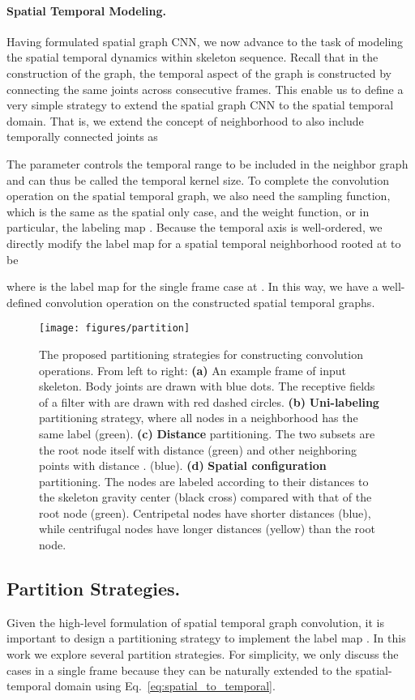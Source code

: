 \documentclass[letterpaper]{article} \usepackage{aaai18}  \usepackage{times}  \usepackage{helvet}  \usepackage{courier}  \usepackage{url}  \usepackage{graphicx}
\begin{document}
\paragraph{Spatial Temporal Modeling.}
Having formulated spatial graph CNN, we now advance to the task of modeling the spatial temporal dynamics within skeleton sequence.
Recall that in the construction of the graph, the temporal aspect of the graph is constructed by connecting the same joints across consecutive frames.
This enable us to define a very simple strategy to extend the spatial graph CNN to the spatial temporal domain. 
That is, we extend the concept of neighborhood to also include temporally connected joints as

The parameter  controls the temporal range to be included in the neighbor graph and can thus be called the temporal kernel size.
To complete the convolution operation on the spatial temporal graph, we also need the sampling function, which is the same as the spatial only case, and the weight function, or in particular, the labeling map . 
Because the temporal axis is well-ordered, we directly modify the label map  for a spatial temporal neighborhood rooted at  to be

where  is the label map for the single frame case at .
In this way, we have a well-defined convolution operation on the constructed spatial temporal graphs.

\begin{figure*}
	\centering
	\texttt{[image: figures/partition]}
	\caption{The proposed partitioning strategies for constructing convolution operations. 
		From left to right: 
		\textbf{(a)} An example frame of input skeleton. Body joints are drawn with blue dots. The receptive fields of a filter with  are drawn with red dashed circles. 
		\textbf{(b)} \textbf{Uni-labeling} partitioning strategy, where all nodes in a neighborhood has the same label (green).
		\textbf{(c)} \textbf{Distance} partitioning. The two subsets are the root node itself with distance  (green) and other neighboring points with distance . (blue).
		\textbf{(d)} \textbf{Spatial configuration} partitioning. The nodes are labeled according to their distances to the skeleton gravity center (black cross) compared with that of the root node (green).
		Centripetal nodes have shorter distances (blue), while centrifugal nodes have longer distances (yellow) than the root node.
	}
	\label{fig:partition}
\end{figure*}


\subsection{Partition Strategies.}\label{sec:partition}
Given the high-level formulation of spatial temporal graph convolution, it is important to design a partitioning strategy to implement the label map .
In this work we explore several partition strategies.
For simplicity, we only discuss the cases in a single frame because they can be naturally extended to the spatial-temporal domain using Eq.~\ref{eq:spatial_to_temporal}.
\end{document}

